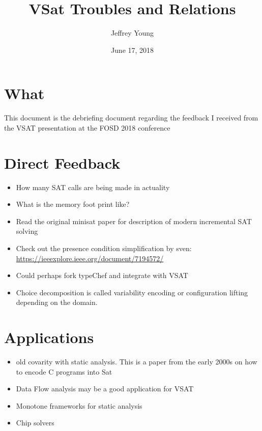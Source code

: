 \documentclass[10pt, letterpaper]{article}
\author{Jeffrey Young}
\date{June 17, 2018}
\title{VSat Troubles and Relations}
\begin{document}
\maketitle

\section*{What}
\label{sec:orgb9f2865}
This document is the debriefing document regarding the feedback I received
from the VSAT presentation at the FOSD 2018 conference

\section*{Direct Feedback}
\label{sec:org8a52ab8}
\begin{itemize}
\item How many SAT calls are being made in actuality
\item What is the memory foot print like?
\item Read the original minisat paper for description of modern incremental SAT solving
\item Check out the presence condition simplification by sven: \url{https://ieeexplore.ieee.org/document/7194572/}
\item Could perhaps fork typeChef and integrate with VSAT
\item Choice decomposition is called variability encoding or configuration lifting depending on the domain.
\end{itemize}

\section*{Applications}
\label{sec:orgfcdf840}
\begin{itemize}
\item old covarity with static analysis. This is a paper from the early 2000s on
how to encode C programs into Sat
\item Data Flow analysis may be a good application for VSAT
\item Monotone frameworks for static analysis
\item Chip solvers
\end{itemize}
\end{document}
